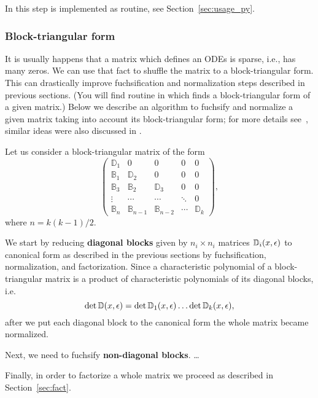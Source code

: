 \documentclass[12pt,a4paper]{article}
\def\M#1{\mathbb{#1}} %
\begin{document}
In \fuchsia this step is implemented as  routine, see Section~\ref{sec:usage_py}.

\subsubsection{Block-triangular form}
\label{sec:blockreduce}

It is usually happens that a matrix which defines an ODEs is sparse, i.e., has many zeros.
We can use that fact to shuffle the matrix to a block-triangular form.
This can drastically improve fuchsification and normalization steps described in previous sections.
(You will find  routine in \fuchsia which finds a block-triangular form of a given matrix.)
Below we describe an algorithm to fuchsify and normalize a given matrix taking into account its block-triangular form; for more details see~\cite[Section~7]{Lee15}, similar ideas were also discussed in \cite{Git15}.

Let us consider a block-triangular matrix of the form
\begin{equation}
\label{eq:bdiag}
\left(
\begin{matrix}
  \M D_1 & 0      & 0 & 0 & 0
\\
  \M B_1 & \M D_2 & 0 & 0 & 0
\\
  \M B_3 & \M B_2 & \M D_3 & 0 & 0
\\
  \vdots & \cdots & \cdots & \ddots & 0
\\
  \M B_n & \M B_{n-1} & \M B_{n-2} & \cdots & \M D_k
\end{matrix}
\right)
,
\end{equation}
where $n=k(k-1)/2$.

We start by reducing {\bf diagonal blocks} given by $n_i \times n_i$ matrices $\M D_i(x,\eps)$ to canonical form as described in the previous sections by fuchsification, normalization, and factorization.
Since a characteristic polynomial of a block-triangular matrix is a product of characteristic polynomials of its diagonal blocks, i.e.
\begin{equation}
  \det{\M D(x,\eps)} = \det{\M D_1(x,\eps)} \ldots  \det{\M D_k(x,\eps)}
  ,
\end{equation}
after we put each diagonal block to the canonical form the whole matrix became normalized.

Next, we need to fuchsify {\bf non-diagonal blocks}.
\ldots

Finally, in order to factorize a whole matrix we proceed as described in Section~\ref{sec:fact}.
\end{document}
